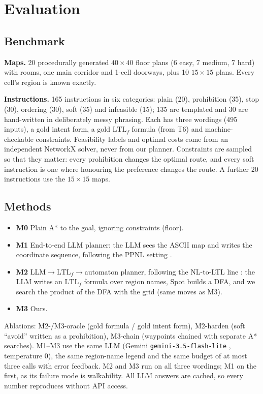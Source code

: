 \documentclass[letterpaper, 10 pt, conference]{ieeeconf}
\newcommand{\Lt}{\mathrm{LTL}_f}
\begin{document}
\section{Evaluation}
\label{sec:eval}

\subsection{Benchmark}

\textbf{Maps.} 20 procedurally generated $40\times40$ floor plans (6 easy, 7 medium, 7
hard) with rooms, one main corridor and 1-cell doorways, plus 10 $15\times15$ plans.
Every cell's region is known exactly.

\textbf{Instructions.} 165 instructions in six categories: plain (20), prohibition (35),
stop (30), ordering (30), soft (35) and infeasible (15); 135 are templated and 30 are
hand-written in deliberately messy phrasing. Each has three wordings (495 inputs), a
gold intent form, a gold $\Lt$ formula (from T6) and machine-checkable constraints.
Feasibility labels and optimal costs come from an independent NetworkX solver, never
from our planner. Constraints are sampled so that they matter: every prohibition
changes the optimal route, and every soft instruction is one where honouring the
preference changes the route. A further 20 instructions use the $15\times15$ maps.

\subsection{Methods}

\begin{itemize}
\item \textbf{M0} Plain A* to the goal, ignoring constraints (floor).
\item \textbf{M1} End-to-end LLM planner: the LLM sees the ASCII map and writes the
  coordinate sequence, following the PPNL setting \cite{aghzal2023ppnl}.
\item \textbf{M2} LLM$\to\Lt\to$automaton planner, following the NL-to-LTL line
  \cite{liu2023lang2ltl,fuggitti2023nl2ltl,cosler2023nl2spec}: the LLM writes an $\Lt$
  formula over region names, Spot \cite{duretlutz2022} builds a DFA, and we search the
  product of the DFA with the grid (same moves as M3).
\item \textbf{M3} Ours.
\end{itemize}
Ablations: M2-/M3-oracle (gold formula / gold intent form), M2-harden (soft ``avoid''
written as a prohibition), M3-chain (waypoints chained with separate A* searches).
M1--M3 use the same LLM (Gemini \texttt{gemini-3.5-flash-lite} \cite{gemini2023},
temperature 0), the same region-name legend and the same budget of at most three calls
with error feedback. M2 and M3 run on all three wordings; M1 on the first, as its
failure mode is walkability. All LLM answers are cached, so every number reproduces
without API access.
\end{document}
